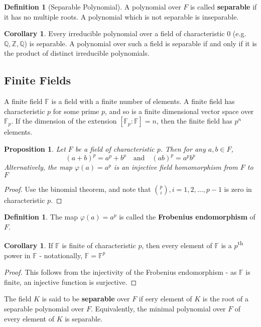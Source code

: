 \documentclass[10pt, oneside, reqno]{amsart}
\theoremstyle{plain}%
\newtheorem{prop}[thm]{Proposition}
\theoremstyle{definition}
\newtheorem{defn}[thm]{Definition}
\newtheorem{cor}[thm]{Corollary}
\theoremstyle{remark}
\newcommand{\Q}{\mathbb{Q}}
\newcommand{\R}{\mathbb{Q}}
\newcommand{\Z}{\mathbb{Z}}
\newcommand{\F}{\mathbb{F}}
\newcommand{\xdeg}[2]{[#1 : #2]}
\begin{document}
\begin{defn}[Separable Polynomial]
	A polynomial over $F$ is called \textbf{separable} if it has no multiple roots.  A polynomial which is not separable is inseparable.
\end{defn}

\begin{cor}
	Every irreducible polynomial over a field of characteristic 0 (e.g. $\Q, \Z, \R$) is separable.  A polynomial over such a field is separable if and only if it is the product of distinct irreducible polynomials.
\end{cor}


\subsection{Finite Fields} %
\label{sub:finite_fields}

A finite field  $\F$ is a field with a finite number of elements.  A finite field has characteristic $p$ for some prime $p$, and so is a finite dimensional vector space over $\F_p$. If the dimension of the extension $\xdeg{\F_p}{\F} = n$, then the finite field has $p^n$ elements.
\begin{prop}
	Let $F$ be a field of characteristic $p$. Then for any $a,b \in F$,\[
		(a+b)^p = a^p + b^p \quad \text{and} \quad (ab)^p = a^p b^p
	\]
	Alternatively, the map $\varphi(a) = a^p$ is an injective field homomorphism from $F$ to $F$
\end{prop}
\begin{proof}
	Use the binomial theorem, and note that ${p \choose i}, i = 1,2,\dots,p-1$ is zero in characteristic $p$.
\end{proof}
\begin{defn}
	The map $\varphi(a) = a^p$ is called the \textbf{Frobenius endomorphism} of $F$.
\end{defn}

\begin{cor}
	If $\F$ is finite of characteristic $p$, then every element of $\F$ is a $p$\textsuperscript{th} power in $\F$ - notationally, $\F = \F^p$
\end{cor}
\begin{proof}
	This follows from the injectivity of the Frobenius endomorphism - as $\F$ is finite, an injective function is surjective.
\end{proof}

The field $K$ is said to be \textbf{separable} over $F$ if eery element of $K$ is the root of a separable polynomial over $F$.  Equivalently, the minimal polynomial over $F$ of every element of $K$ is separable.
\end{document}
